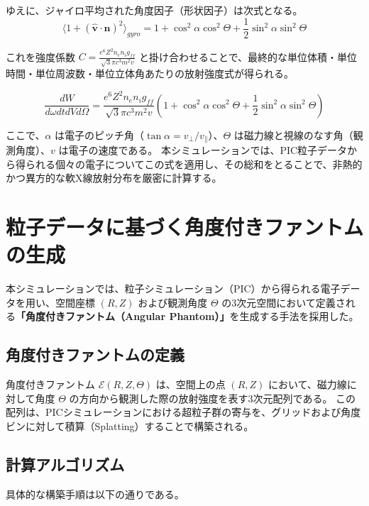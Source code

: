 \documentclass[a4paper,11pt]{bxjsarticle} %
\begin{document}
ゆえに、ジャイロ平均された角度因子（形状因子）は次式となる。
\begin{equation}
    \langle 1 + (\hat{\bm{v}} \cdot \bm{n})^2 \rangle_{gyro} = 1 + \cos^2\alpha \cos^2\Theta + \frac{1}{2} \sin^2\alpha \sin^2\Theta
\end{equation}

これを強度係数 $C = \frac{e^6 Z^2 n_e n_i g_{ff}}{\sqrt{3}\pi c^3 m^2 v}$ と掛け合わせることで、最終的な単位体積・単位時間・単位周波数・単位立体角あたりの放射強度式が得られる。

\begin{equation}
    \frac{dW}{d\omega dt dV d\Omega} = \frac{e^6 Z^2 n_e n_i g_{ff}}{\sqrt{3}\pi c^3 m^2 v} \left( 1 + \cos^2\alpha \cos^2\Theta + \frac{1}{2}\sin^2\alpha \sin^2\Theta \right)
\end{equation}

ここで、$\alpha$ は電子のピッチ角（$\tan\alpha = v_{\perp}/v_{\parallel}$）、$\Theta$ は磁力線と視線のなす角（観測角度）、$v$ は電子の速度である。
本シミュレーションでは、PIC粒子データから得られる個々の電子についてこの式を適用し、その総和をとることで、非熱的かつ異方的な軟X線放射分布を厳密に計算する。




\section{粒子データに基づく角度付きファントムの生成}

本シミュレーションでは、粒子シミュレーション（PIC）から得られる電子データを用い、空間座標 $(R, Z)$ および観測角度 $\Theta$ の3次元空間において定義される\textbf{「角度付きファントム（Angular Phantom）」}を生成する手法を採用した。

\subsection{角度付きファントムの定義}
角度付きファントム $\mathcal{E}(R, Z, \Theta)$ は、空間上の点 $(R, Z)$ において、磁力線に対して角度 $\Theta$ の方向から観測した際の放射強度を表す3次元配列である。
この配列は、PICシミュレーションにおける超粒子群の寄与を、グリッドおよび角度ビンに対して積算（Splatting）することで構築される。

\subsection{計算アルゴリズム}
具体的な構築手順は以下の通りである。
\end{document}
